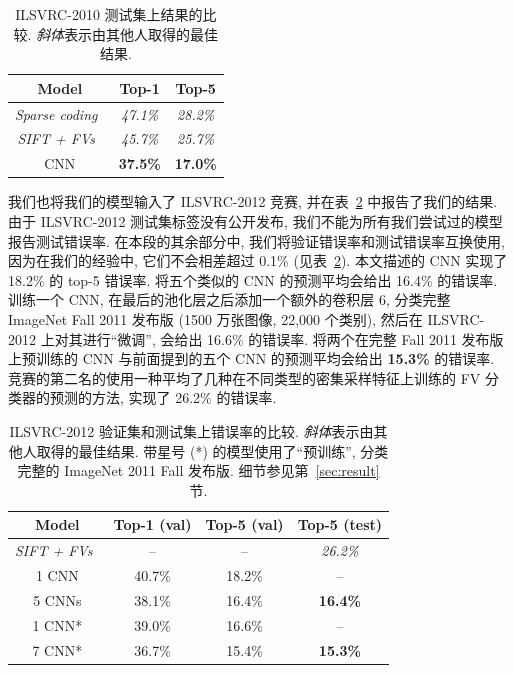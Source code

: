 \documentclass{article} %
\begin{document}
\begin{table}
\centering
\begin{tabular}{|c|c|c|}
  \hline
  \textbf{Model} & \textbf{Top-1} & \textbf{Top-5} \\
  \hline
  \hline
  \emph{Sparse coding~\cite{berg2010}} & \emph{47.1\%} & \emph{28.2\%} \\
  \hline
  \emph{SIFT + FVs~\cite{sanchez2011}} & \emph{45.7\%} & \emph{25.7\%} \\
  \hline
  CNN & \textbf{37.5\%} & \textbf{17.0\%} \\
  \hline
\end{tabular}

\caption{ILSVRC-2010 测试集上结果的比较. \emph{斜体}表示由其他人取得的最佳结果.}
\label{tab:ilsvrc2010}
\end{table}

我们也将我们的模型输入了 ILSVRC-2012 竞赛, 并在表~\ref{tab:ilsvrc2012} 中报告了我们的结果. 由于 ILSVRC-2012 测试集标签没有公开发布, 我们不能为所有我们尝试过的模型报告测试错误率. 在本段的其余部分中, 我们将验证错误率和测试错误率互换使用, 因为在我们的经验中, 它们不会相差超过 0.1\% (见表~\ref{tab:ilsvrc2012}). 本文描述的 CNN 实现了 18.2\% 的 top-5 错误率. 将五个类似的 CNN 的预测平均会给出 16.4\% 的错误率. 训练一个 CNN, 在最后的池化层之后添加一个额外的卷积层 6, 分类完整 ImageNet Fall 2011 发布版 (1500 万张图像, 22,000 个类别), 然后在 ILSVRC-2012 上对其进行“微调”, 会给出 16.6\% 的错误率. 将两个在完整 Fall 2011 发布版上预训练的 CNN 与前面提到的五个 CNN 的预测平均会给出 \textbf{15.3\%} 的错误率. 竞赛的第二名的使用一种平均了几种在不同类型的密集采样特征上训练的 FV 分类器的预测的方法, 实现了 26.2\% 的错误率.

\begin{table}
\centering
\begin{tabular}{|c|c|c|c|}
  \hline
  \textbf{Model} & \textbf{Top-1 (val)} & \textbf{Top-5 (val)} & \textbf{Top-5 (test)}\\
  \hline
  \hline
  \emph{SIFT + FVs~\cite{deng2012}} & -- & -- & \emph{26.2\%} \\
  \hline
  1 CNN & 40.7\% & 18.2\% & --\\
  \hline
  5 CNNs & 38.1\% & 16.4\% & \textbf{16.4\%}\\
  \hline
  1 CNN* & 39.0\% & 16.6\% & --\\
  \hline
  7 CNN* & 36.7\% & 15.4\% & \textbf{15.3\%} \\
  \hline
\end{tabular}

\caption{ILSVRC-2012 验证集和测试集上错误率的比较. \emph{斜体}表示由其他人取得的最佳结果. 带星号 (*) 的模型使用了“预训练”, 分类完整的 ImageNet 2011 Fall 发布版. 细节参见第~\ref{sec:result} 节.}
\label{tab:ilsvrc2012}
\end{table}
\end{document}
